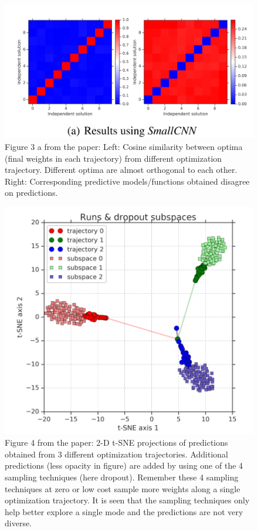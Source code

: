 \begin{figure}
	\centering
	\includegraphics[width=0.7\linewidth]{./Figures/Figure3a.png}
	\caption{Figure 3 a from the paper: 
		Left: Cosine similarity between optima (final weights in each trajectory) from different optimization trajectory. Different optima are almost orthogonal to each other. Right: Corresponding predictive models/functions obtained disagree on predictions.}
	\label{}
\end{figure}
\begin{figure}
	\centering
	\includegraphics[width=0.7\linewidth]{./Figures/Figure4.png}
	\caption{Figure 4 from the paper: 
		2-D t-SNE projections of predictions obtained from 3 different optimization trajectories. Additional predictions (less opacity in figure) are added by using one of the 4 sampling techniques (here dropout). Remember these 4 sampling techniques at zero or low cost sample more weights along a single optimization trajectory. It is seen that the sampling techniques only help better explore a single mode and the predictions are not very diverse.}
	\label{}
\end{figure}
